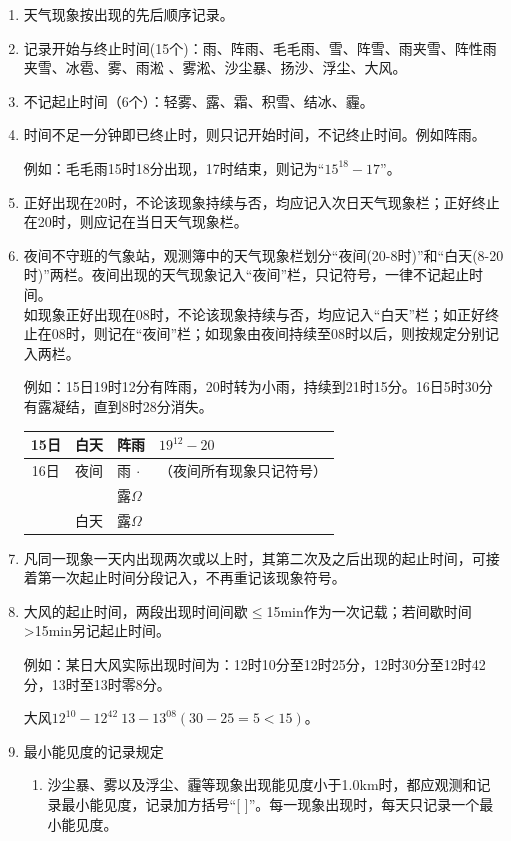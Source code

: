 ﻿\documentclass[UTF8,11pt]{ctexbook}%
\begin{document}
\begin{enumerate}
	\item 天气现象按出现的先后顺序记录。
	\item 记录开始与终止时间(15个)：雨、阵雨、毛毛雨、雪、阵雪、雨夹雪、阵性雨夹雪、冰雹、雾、雨淞 、雾淞、沙尘暴、扬沙、浮尘、大风。
	\item 不记起止时间（6个）：轻雾、露、霜、积雪、结冰、霾。
	\item 时间不足一分钟即已终止时，则只记开始时间，不记终止时间。例如阵雨。\par\qquad
	例如：毛毛雨15时18分出现，17时结束，则记为“\(15^{18}-17\)”。
	\item 正好出现在20时，不论该现象持续与否，均应记入次日天气现象栏；正好终止在20时，则应记在当日天气现象栏。
	\item 夜间不守班的气象站，观测簿中的天气现象栏划分“夜间(20-8时)”和“白天(8-20时)”两栏。夜间出现的天气现象记入“夜间”栏，只记符号，一律不记起止时间。\\
	如现象正好出现在08时，不论该现象持续与否，均应记入“白天”栏；如正好终止在08时，则记在“夜间”栏；如现象由夜间持续至08时以后，则按规定分别记入两栏。\par\qquad
	例如：15日19时12分有阵雨，20时转为小雨，持续到21时15分。16日5时30分有露凝结，直到8时28分消失。\\
	\begin{center}
		\begin{tabular}{ccll}
			\hline
			15日 & 白天 & 阵雨 & \(19^{12}-20\)\\
			\hline
			16日 & 夜间 & 雨\(\ \cdot\) & （夜间所有现象只记符号）\\
			 & & 露\(\Omega\) & \\
			 & 白天 & 露\(\Omega\) & \\
			\hline
		\end{tabular}
	\end{center}
	\item 凡同一现象一天内出现两次或以上时，其第二次及之后出现的起止时间，可接着第一次起止时间分段记入，不再重记该现象符号。
	\item 大风的起止时间，两段出现时间间歇\(\leq\)15min作为一次记载；若间歇时间>15min另记起止时间。\par\qquad
	例如：某日大风实际出现时间为：12时10分至12时25分，12时30分至12时42分，13时至13时零8分。\par\qquad
	大风\quad \(12^{10}-12^{42}\ 13-13^{08} (30-25=5<15)\)。
	\item 最小能见度的记录规定\begin{enumerate}
		\item 沙尘暴、雾以及浮尘、霾等现象出现能见度小于1.0km时，都应观测和记录最小能见度，记录加方括号“[ ]”。每一现象出现时，每天只记录一个最小能见度。

\end{enumerate}
\end{enumerate}
\end{document}
